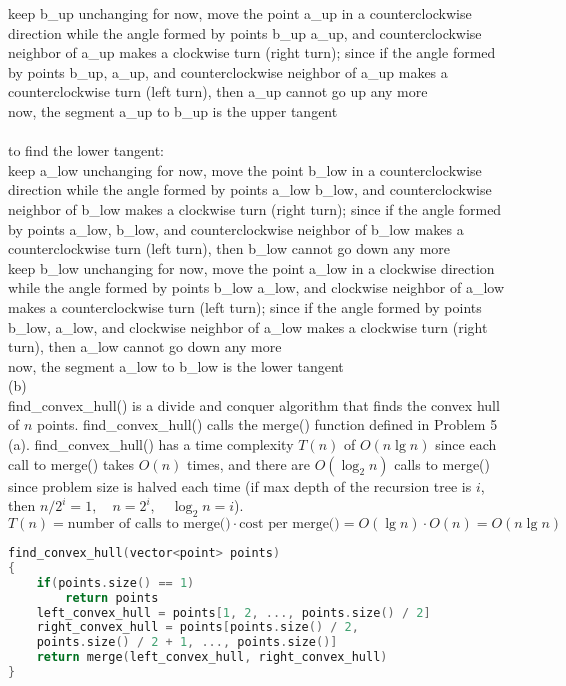 \documentclass[12pt,border=4pt,multi]{article} %
\begin{document}
keep b\_up unchanging for now, move the point a\_up in a counterclockwise direction while the angle formed by points b\_up a\_up, and counterclockwise neighbor of a\_up makes a clockwise turn (right turn); since if the angle formed by points b\_up, a\_up, and counterclockwise neighbor of a\_up makes a counterclockwise turn (left turn), then a\_up cannot go up any more\\
now, the segment a\_up to b\_up is the upper tangent\\
\\
to find the lower tangent:\\
keep a\_low unchanging for now, move the point b\_low in a counterclockwise direction while the angle formed by points a\_low b\_low, and counterclockwise neighbor of b\_low makes a clockwise turn (right turn); since if the angle formed by points a\_low, b\_low, and counterclockwise neighbor of b\_low makes a counterclockwise turn (left turn), then b\_low cannot go down any more\\
keep b\_low unchanging for now, move the point a\_low in a clockwise direction while the angle formed by points b\_low a\_low, and clockwise neighbor of a\_low makes a counterclockwise turn (left turn); since if the angle formed by points b\_low, a\_low, and clockwise neighbor of a\_low makes a clockwise turn (right turn), then a\_low cannot go down any more\\
now, the segment a\_low to b\_low is the lower tangent\\
\newpage
\noindent
(b)\\
find\_convex\_hull() is a divide and conquer algorithm that finds the convex hull of $n$ points. find\_convex\_hull() calls the merge() function defined in Problem 5 (a). find\_convex\_hull() has a time complexity $T(n)$ of $O(n \lg n)$ since each call to merge() takes $O(n)$ times, and there are $O(\log_2 n)$ calls to merge() since problem size is halved each time (if max depth of the recursion tree is $i$, then $n / 2^i = 1,\quad n = 2^i,\quad \log_2 n = i$).\\
$T(n) = \text{number of calls to merge()} \cdot \text{cost per merge()} = O(\lg n) \cdot O(n) = O(n \lg n)$
\begin{lstlisting}[language = c]
find_convex_hull(vector<point> points)
{
    if(points.size() == 1)
        return points
    left_convex_hull = points[1, 2, ..., points.size() / 2]
    right_convex_hull = points[points.size() / 2, 
    points.size() / 2 + 1, ..., points.size()]
    return merge(left_convex_hull, right_convex_hull)
}
\end{lstlisting}
\end{document}
